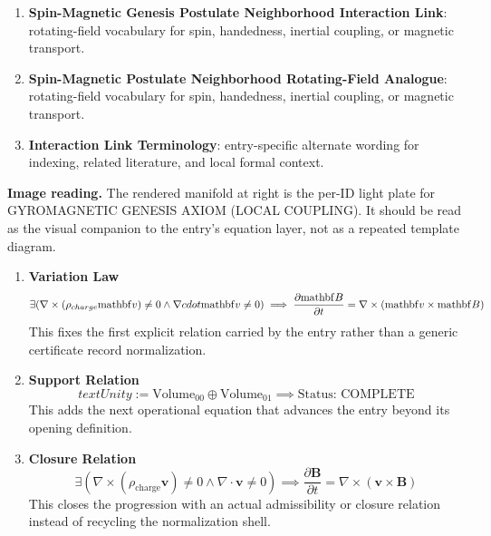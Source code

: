 \begin{enumerate}[leftmargin=1.6em,itemsep=6pt,topsep=4pt]
\item \textbf{Spin-Magnetic Genesis Postulate Neighborhood Interaction Link}: rotating-field vocabulary for spin, handedness, inertial coupling, or magnetic transport.
\item \textbf{Spin-Magnetic Postulate Neighborhood Rotating-Field Analogue}: rotating-field vocabulary for spin, handedness, inertial coupling, or magnetic transport.
\item \textbf{Interaction Link Terminology}: entry-specific alternate wording for indexing, related literature, and local formal context.
\end{enumerate}

\begin{samepage}
\noindent\begin{minipage}[t]{0.45\linewidth}
\vspace{0pt}
\raggedright
\scriptsize\textbf{Image reading.} The rendered manifold at right is the per-ID light plate for GYROMAGNETIC GENESIS AXIOM (LOCAL COUPLING). It should be read as the visual companion to the entry's equation layer, not as a repeated template diagram.\par
\end{minipage}\hfill
\begin{minipage}[t]{0.53\linewidth}
\vspace*{-0.10in}
\raggedright
{}
\end{minipage}
\end{samepage}

\clearpage


\begin{enumerate}[leftmargin=1.6em,itemsep=9pt,topsep=6pt]
\item \textbf{Variation Law}
\[
\exists (\nabla \times (\rho_{charge} \mathrm{mathbf}{v}) \neq 0 \land \nabla \\cdot \mathrm{mathbf}{v} \neq 0) \implies \frac{\partial \mathrm{mathbf}{B}}{\partial t} = \nabla \times (\mathrm{mathbf}{v} \times \mathrm{mathbf}{B})
\]
This fixes the first explicit relation carried by the entry rather than a generic certificate record normalization.

\item \textbf{Support Relation}
\[
text{Unity} := \text{Volume}_{00} \oplus \text{Volume}_{01} \implies \text{Status: COMPLETE}
\]
This adds the next operational equation that advances the entry beyond its opening definition.

\item \textbf{Closure Relation}
\[
\exists \left(\nabla \times (\rho_{\mathrm{charge}}\mathbf{v}) \neq 0 \land \nabla \cdot \mathbf{v} \neq 0\right)
\implies
\frac{\partial \mathbf{B}}{\partial t}
=
\nabla \times (\mathbf{v}\times\mathbf{B})
\]
This closes the progression with an actual admissibility or closure relation instead of recycling the normalization shell.
\end{enumerate}

